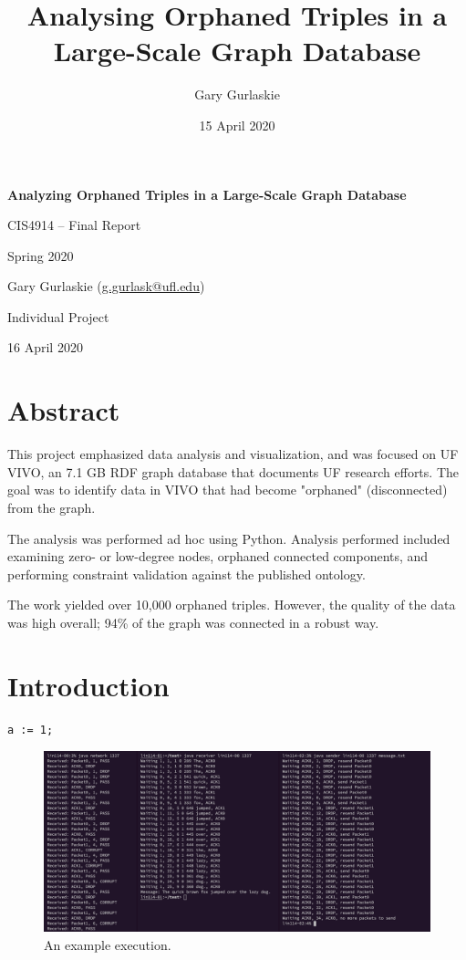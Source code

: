 \documentclass[12pt]{article}
\title{Analysing Orphaned Triples in a Large-Scale Graph Database}
\author{Gary Gurlaskie}
\date{15 April 2020}
\begin{document}
\begin{titlepage}
 \centering
 \vspace*{1in}
 \begin{Large}\bfseries
  Analyzing Orphaned Triples in a Large-Scale Graph Database\par
 \end{Large}

  CIS4914 -- Final Report\par
  Spring 2020\par

  \vspace*{0.2in}
  
  Gary Gurlaskie (\url{g.gurlask@ufl.edu})\par
  Individual Project\par
  16 April 2020\par
\end{titlepage}

\section*{Abstract}
This project emphasized data analysis and visualization, and was focused on UF VIVO, an 7.1 GB RDF graph database that documents UF research efforts. The goal was to identify data in VIVO that had become "orphaned" (disconnected) from the graph.

The analysis was performed ad hoc using Python. Analysis performed included examining zero- or low-degree nodes, orphaned connected components, and performing constraint validation against the published ontology.

The work yielded over 10,000 orphaned triples. However, the quality of the data was high overall; 94\% of the graph was connected in a robust way.

\section*{Introduction}

\begin{lstlisting}
a := 1;
\end{lstlisting}

\begin{figure}[h!]
\centering
\includegraphics[width=\textwidth]{output.png}
\caption{An example execution.}
\label{fig:output}
\end{figure}
\end{document}
